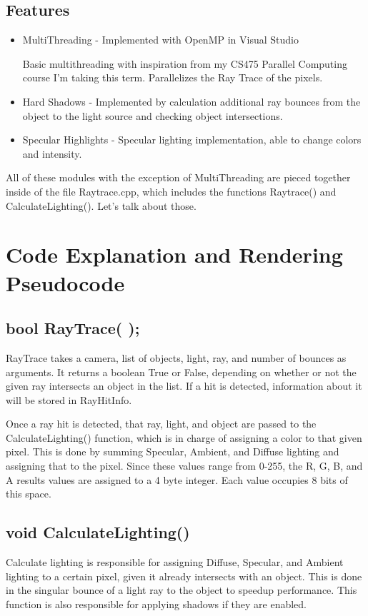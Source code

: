 \documentclass{article}
\begin{document}
\subsection{Features}
\begin{itemize}
	\item MultiThreading - Implemented with OpenMP in Visual Studio

	Basic multithreading with inspiration from my CS475 Parallel Computing course I'm taking this term. Parallelizes the Ray Trace of the pixels.
    
	\item Hard Shadows - Implemented by calculation additional ray bounces from the object to the light source and checking object intersections.
    
    \item Specular Highlights - Specular lighting implementation, able to change colors and intensity.
\end{itemize}

All of these modules with the exception of MultiThreading are pieced together inside of the file Raytrace.cpp, which includes the functions Raytrace() and CalculateLighting(). Let’s talk about those.


\section{Code Explanation and Rendering Pseudocode}
\subsection{bool RayTrace( );}
RayTrace takes a camera, list of objects, light, ray, and number of bounces as arguments. It returns a boolean True or False, depending on whether or not the given ray intersects an object in the list. If a hit is detected, information about it will be stored in RayHitInfo. 

Once a ray hit is detected, that ray, light, and object are passed to the CalculateLighting() function, which is in charge of assigning a color to that given pixel. This is done by summing Specular, Ambient, and Diffuse lighting and assigning that to the pixel. Since these values range from 0-255, the R, G, B, and A results values are assigned to a 4 byte integer. Each value occupies 8 bits of this space.

\subsection{void CalculateLighting()}
Calculate lighting is responsible for assigning Diffuse, Specular, and Ambient lighting to a certain pixel, given it already intersects with an object. This is done in the singular bounce of a light ray to the object to speedup performance. This function is also responsible for applying shadows if they are enabled. 
\end{document}
